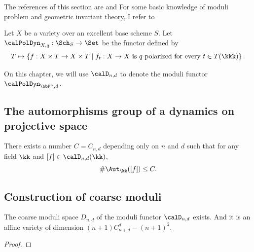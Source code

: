 

The references of this section are \cite{Silverman-2012-ModuliSpacesArithmetic,Levy-2011-SpaceMorphismsProjective} and \Yang{}
For some basic knowledge of moduli problem and geometric invariant theory, I refer to \Yang{}


\begin{definition}[label=\labelNFM{def:the-moduli-functor-of-dynamics-on-projective-spaces}, status=draft, tag=0000000]
	Let $X$ be a variety over an excellent base scheme $S$.
	Let $\calPolDyn_{X,q}: \Sch_S \to \Set$ be the functor defined by
	\[ T \mapsto \left\{ f:X\times T \to X \times T \;\middle|\; f_t: X \to X \text{ is } q\text{-polarized for every } t \in T(\kkk) \right\}. \]
	\Yang{}
\end{definition}

On this chapter, we will use $\calD_{n,d}$ to denote the moduli functor $\calPolDyn_{\bbP^n,d}$.


\subsection[status=draft,tag=0000000,label=\labelNFM{subsec:automorphism-of-dynamics-on-pn}]{The automorphisms group of a dynamics on projective space}

\begin{theorem}[label=\labelNFM{thm:uniform-bound-for-the-auto-group-of-dynamics-on-pn}, status=draft, tag=0000000]
	There exists a number $C = C_{n,d}$ depending only on $n$ and $d$ such that for any field $\kk$ and $[f] \in \calD_{n,d}(\kk)$,
	\[ \# \Aut_{\kk}([f]) \leq C. \]
\end{theorem}


\subsection[status=draft,tag=0000000,label=\labelNFM{subsec:construction-of-coarse-moduli-of-dynamics-on-projective-space}]{Construction of coarse moduli}

\begin{theorem}[label=\labelNFM{thm:existence-of-coarse-moduli-of-dynamics-on-projective-space}, status=draft, tag=0000000]
	The coarse moduli space $D_{n,d}$ of the moduli functor $\calD_{n,d}$ exists.
	And it is an affine variety of dimension $(n+1)C_{n+d}^d - (n+1)^2$.
\end{theorem}
\begin{proof}
	\Yang{}
\end{proof}

